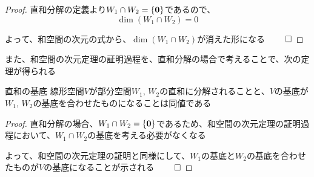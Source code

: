\documentclass[../../../topic_linear-algebra]{subfiles}
\begin{document}
\begin{proof}
  直和分解の定義より$W_1 \cap W_2 = \{ \vb*{0} \}$であるので、
  \begin{equation*}
    \dim(W_1 \cap W_2) = 0
  \end{equation*}

  よって、和空間の次元の式から、$\dim(W_1 \cap W_2)$が消えた形になる $\qed$
\end{proof}

\sectionline

また、和空間の次元定理の証明過程を、直和分解の場合で考えることで、次の定理が得られる

\begin{theorem}{直和の基底}\label{thm:direct-sum-and-basis}
  線形空間$V$が部分空間$W_1,\,W_2$の直和に分解されることと、$V$の基底が$W_1,\,W_2$の基底を合わせたものになることは同値である
\end{theorem}

\begin{proof}
  直和分解の場合、$W_1 \cap W_2 = \{ \vb*{0} \}$であるため、和空間の次元定理の証明過程において、$W_1 \cap W_2$の基底を考える必要がなくなる

  \br

  よって、和空間の次元定理の証明と同様にして、$W_1$の基底と$W_2$の基底を合わせたものが$V$の基底になることが示される $\qed$
\end{proof}
\end{document}
